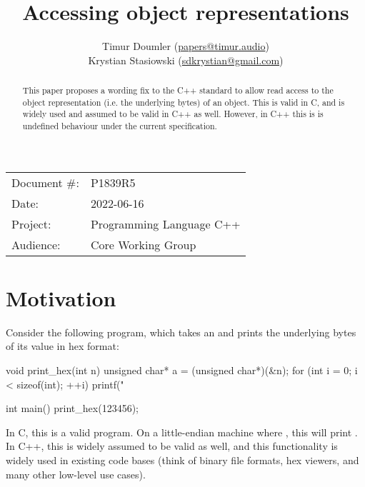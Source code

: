 

\newcommand{\forceindent}{\parindent=1em\indent\parindent=0pt\relax} %


\title{Accessing object representations}
\author{
  Timur Doumler \small(\href{mailto:papers@timur.audio}{papers@timur.audio}) \\
  Krystian Stasiowski \small(\href{mailto:sdkrystian@gmail.com}{sdkrystian@gmail.com})
}
\date{}
\maketitle

\begin{tabular}{ll}
Document \#: & P1839R5 \\
Date: & 2022-06-16\\
Project: & Programming Language C++ \\
Audience: & Core Working Group
\end{tabular}


\begin{abstract}
This paper proposes a wording fix to the C++ standard to allow read access to the object representation (i.e. the underlying bytes) of an object. This is valid in C, and is widely used and assumed to be valid in C++ as well. However, in C++ this is is undefined behaviour under the current specification.
\end{abstract}

\section{Motivation}
\label{sec:motivation}

Consider the following program, which takes an  and prints the underlying bytes of its value in hex format:

\begin{codeblock}
void print_hex(int n) {
  unsigned char* a = (unsigned char*)(&n);
  for (int i = 0; i < sizeof(int); ++i)
  printf("%
}

int main() {
  print_hex(123456);
}
\end{codeblock}

In C, this is a valid program. On a little-endian machine where , this will print . In C++, this is widely assumed to be valid as well, and this functionality is widely used in existing code bases (think of binary file formats, hex viewers, and many other low-level use cases).


